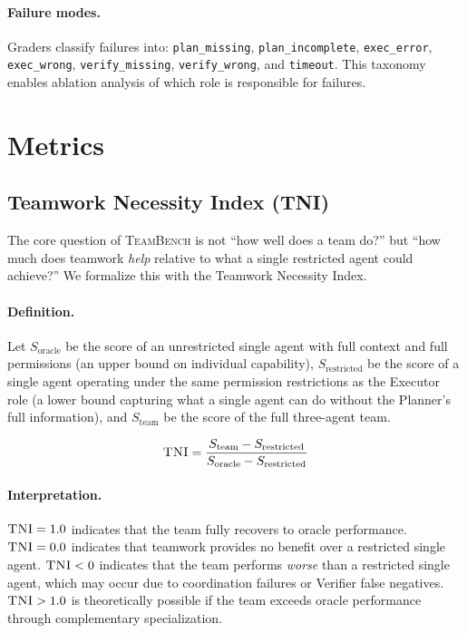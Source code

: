 \documentclass{article}
\newcommand{\teambench}{\textsc{TeamBench}}
\newcommand{\tni}{\textsc{TNI}}
\newcommand{\sys}[1]{\texttt{#1}}
\begin{document}
\paragraph{Failure modes.}
Graders classify failures into: \sys{plan\_missing}, \sys{plan\_incomplete},
\sys{exec\_error}, \sys{exec\_wrong}, \sys{verify\_missing},
\sys{verify\_wrong}, and \sys{timeout}. This taxonomy enables ablation
analysis of which role is responsible for failures.

\section{Metrics}
\label{sec:metrics}

\subsection{Teamwork Necessity Index (TNI)}
\label{sec:metrics:tni}

The core question of \teambench{} is not ``how well does a team do?'' but
``how much does teamwork \emph{help} relative to what a single restricted
agent could achieve?'' We formalize this with the Teamwork Necessity Index.

\paragraph{Definition.}
Let $S_{\text{oracle}}$ be the score of an unrestricted single agent with
full context and full permissions (an upper bound on individual capability),
$S_{\text{restricted}}$ be the score of a single agent operating under the
same permission restrictions as the Executor role (a lower bound capturing
what a single agent can do without the Planner's full information), and
$S_{\text{team}}$ be the score of the full three-agent team.

\begin{equation}
  \tni = \frac{S_{\text{team}} - S_{\text{restricted}}}
              {S_{\text{oracle}} - S_{\text{restricted}}}
  \label{eq:tni}
\end{equation}

\paragraph{Interpretation.}
$\tni = 1.0$ indicates that the team fully recovers to oracle performance.
$\tni = 0.0$ indicates that teamwork provides no benefit over a restricted
single agent. $\tni < 0$ indicates that the team performs \emph{worse}
than a restricted single agent, which may occur due to coordination failures
or Verifier false negatives. $\tni > 1.0$ is theoretically possible if the
team exceeds oracle performance through complementary specialization.
\end{document}
